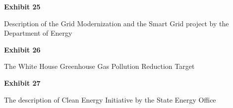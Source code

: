 \documentclass{article}
\begin{document}
% 

% 

% 

% 



\vspace*{\fill}
\begin{center}
{\LARGE \bf
Exhibit 25
}

\vspace{10\baselineskip}

{\large Description of the Grid Modernization and the Smart Grid project by the Department of Energy}

\end{center}
\vspace*{\fill}






\vspace*{\fill}
\begin{center}
{\LARGE \bf
Exhibit 26
}

\vspace{10\baselineskip}

{\large The White House Greenhouse Gas Pollution Reduction Target}

\end{center}
\vspace*{\fill}






\vspace*{\fill}
\begin{center}
{\LARGE \bf
Exhibit 27
}

\vspace{10\baselineskip}

{\large The description of Clean Energy Initiative by the State Energy Office }

\end{center}
\vspace*{\fill}
\end{document}

